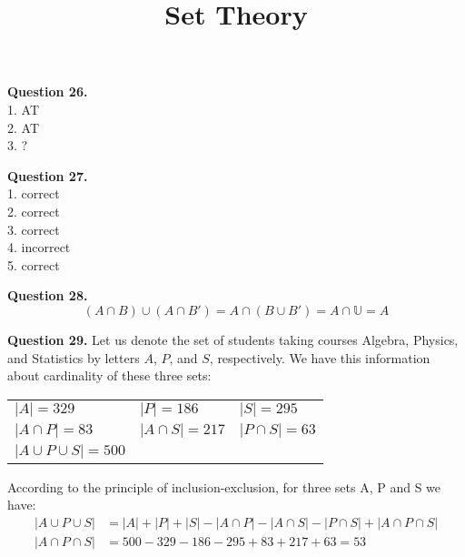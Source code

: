\documentclass{ximera}
\title{Set Theory}
\begin{document}
\maketitle

\textbf{Question 26.} \\
1. AT \\
2. AT \\
3. ?

\textbf{Question 27.} \\
1. correct \\
2. correct \\
3. correct \\
4. incorrect \\
5. correct

\textbf{Question 28.} 
\begin{equation*}
(A \cap B) \cup (A \cap B') = A \cap (B \cup B') = A \cap \mathbb{U} = A
\end{equation*}

\textbf{Question 29.}
Let us denote the set of students taking courses Algebra, Physics, and Statistics by letters $A$, $P$, and $S$, respectively. We have this information about cardinality of these three sets:

\begin{tabular}{lll}
 $|A| = 329$ & $|P| = 186$ & $|S| = 295$ \\
 $|A \cap P| = 83$ & $|A \cap S| = 217$ & $|P \cap S| = 63$ \\
 $|A \cup P \cup S| = 500$ &&
\end{tabular}

According to the principle of inclusion-exclusion, for three sets A, P and S we have:
\begin{align*}
|A \cup P \cup S| &= |A| + |P| + |S| - |A \cap P| - |A \cap S| - |P \cap S| + |A \cap P \cap S|\\
|A \cap P \cap S| &= 500 - 329 - 186 - 295 + 83 + 217 + 63 = 53
\end{align*}
\end{document}
